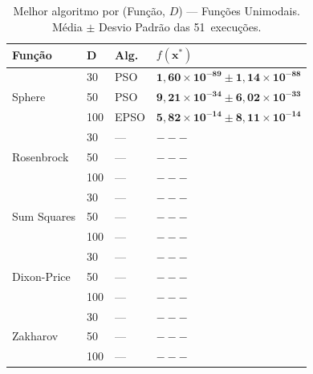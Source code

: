 \documentclass[runningheads]{llncs}
\begin{document}
\begin{table}[H]
\caption{Melhor algoritmo por (Função, $D$) — Funções Unimodais.
Média $\pm$ Desvio Padrão das 51~execuções.}
\label{tab:unimodais}
\centering
\scriptsize
\begin{tabular}{llll}
\toprule
\textbf{Função} & \textbf{D} & \textbf{Alg.} & $f(\mathbf{x}^*)$ \\
\midrule
\multirow{3}{*}{Sphere}
  & 30  & PSO  & $\mathbf{1{,}60{\times}10^{-89} \pm 1{,}14{\times}10^{-88}}$ \\
  & 50  & PSO  & $\mathbf{9{,}21{\times}10^{-34} \pm 6{,}02{\times}10^{-33}}$ \\
  & 100 & EPSO & $\mathbf{5{,}82{\times}10^{-14} \pm 8{,}11{\times}10^{-14}}$ \\
\midrule
\multirow{3}{*}{Rosenbrock}
  & 30  & --- & $\mathbf{---}$ \\
  & 50  & --- & $\mathbf{---}$ \\
  & 100 & --- & $\mathbf{---}$ \\
\midrule
\multirow{3}{*}{Sum Squares}
  & 30  & --- & $\mathbf{---}$ \\
  & 50  & --- & $\mathbf{---}$ \\
  & 100 & --- & $\mathbf{---}$ \\
\midrule
\multirow{3}{*}{Dixon-Price}
  & 30  & --- & $\mathbf{---}$ \\
  & 50  & --- & $\mathbf{---}$ \\
  & 100 & --- & $\mathbf{---}$ \\
\midrule
\multirow{3}{*}{Zakharov}
  & 30  & --- & $\mathbf{---}$ \\
  & 50  & --- & $\mathbf{---}$ \\
  & 100 & --- & $\mathbf{---}$ \\
\bottomrule
\end{tabular}
\end{table}
\end{document}

